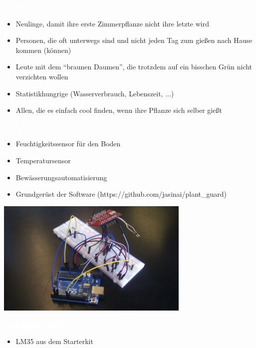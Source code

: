 \documentclass[bigger]{beamer}
\newcommand{\topic}[1]{{\huge{\textcolor{white}{\textbf{#1}}}}}
\begin{document}
\begin{frame}{\topic{Abnehmer/Interessierte}}
	\begin{itemize}
		\item Neulinge, damit ihre erste Zimmerpflanze nicht ihre letzte wird
		\item Personen, die oft unterwegs sind und nicht jeden Tag zum gießen nach Hause kommen (können)
		\item Leute mit dem “braunen Daumen”, die trotzdem auf ein bisschen Grün nicht verzichten wollen
		\item Statistikhungrige (Wasserverbrauch, Lebenszeit, ...)
		\item Allen, die es einfach cool finden, wenn ihre Pflanze sich selber gießt
	\end{itemize}
\end{frame}

\begin{frame}{\topic{Bisherige Arbeiten}}
	\begin{itemize}
		\item Feuchtigkeitssensor für den Boden
		\item Temperatursensor
		\item Bewässerungsautomatisierung
		\item Grundgerüst der Software (https://github.com/jasinai/plant\_guard)
	\end{itemize}
\end{frame}
\begin{frame}
\includegraphics[width=350px]{board.jpg}
\end{frame}
\begin{frame}{\topic{Temperatursensor}}
	\begin{itemize}
		\item LM35 aus dem Starterkit
	\end{itemize}
\end{frame}
\end{document}
